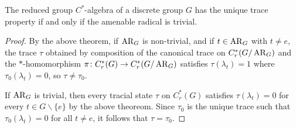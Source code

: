 \begin{corollary}\label{trace unique AR triv}
The reduced group $C^*$-algebra of a discrete group $G$ has the unique trace property if and only if the amenable radical is trivial.
\begin{proof}
By the above theorem, if $\operatorname{AR}_G$ is non-trivial, and if $t \in \operatorname{AR}_G$ with $t \neq e$, the trace $\tau$ obtained by composition of the canonical trace on $C_r^*(G/\operatorname{AR}_G)$ and the $*$-homomorphism $\pi \colon C_r^*(G) \to C_r^*(G / \operatorname{AR}_G)$ satisfies $\tau(\lambda_t)=1$ where $\tau_0(\lambda_t)=0$, so $\tau \neq \tau_0$.

\noindent If $\operatorname{AR}_G$ is trivial, then every tracial state $\tau$ on $C_r^*(G)$ satisfies $\tau(\lambda_t)=0$ for every $t \in G \backslash \{e\}$ by the above theoreom. Since $\tau_0$ is the unique trace such that $\tau_0(\lambda_t)=0$ for all $t \neq e$, it follows that $\tau=\tau_0$.
\end{proof}
\end{corollary}


